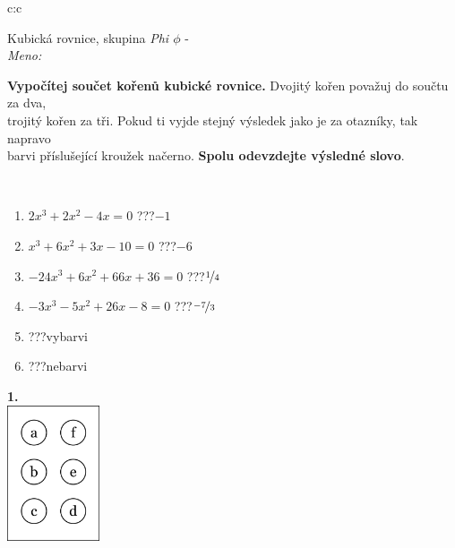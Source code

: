 \documentclass[10pt]{report}
\begin{document}
\begin{tabular}{c:c}
\begin{minipage}[c][104.5mm][t]{0.5\linewidth}
\begin{center}
\vspace{7mm}
{\huge Kubická rovnice, skupina \textit{Phi $\phi$} -}\\[5mm]
\textit{Meno:}\phantom{xxxxxxxxxxxxxxxxxxxxxxxxxxxxxxxxxxxxxxxxxxxxxxxxxxxxxxxxxxxxxxxxx}\\[5mm]
\begin{minipage}{0.95\linewidth}
\textbf{Vypočítej součet kořenů kubické rovnice.} Dvojitý kořen považuj do součtu za dva,\\trojitý kořen za tři. Pokud ti vyjde stejný výsledek jako je za otazníky, tak napravo\\barvi příslušející kroužek načerno. \textbf{Spolu odevzdejte výsledné slovo}.
\end{minipage}
\\[1mm]
\begin{minipage}{0.79\linewidth}
\begin{center}
\begin{varwidth}{\linewidth}
\begin{enumerate}
\Large
\item $2x^3+2x^2-4x=0$\quad \dotfill\; ???\;\dotfill \quad $-1$
\item $x^3+6x^2+3x-10=0$\quad \dotfill\; ???\;\dotfill \quad $-6$
\item $-24x^3+6x^2+66x+36=0$\quad \dotfill\; ???\;\dotfill \quad $\nicefrac{1}{4}$
\item $-3x^3-5x^2+26x-8=0$\quad \dotfill\; ???\;\dotfill \quad $\nicefrac{-7}{3}$
\item \quad \dotfill\; ???\;\dotfill \quad vybarvi
\item \quad \dotfill\; ???\;\dotfill \quad nebarvi
\end{enumerate}
\end{varwidth}
\end{center}
\end{minipage}
\begin{minipage}{0.20\linewidth}
\begin{center}
{\Huge\bfseries 1.} \\[2mm]
\includegraphics[height=40mm]{../images/braille.png}

\end{center}
\end{minipage}
\end{center}
\end{minipage}
\end{tabular}
\end{document}
